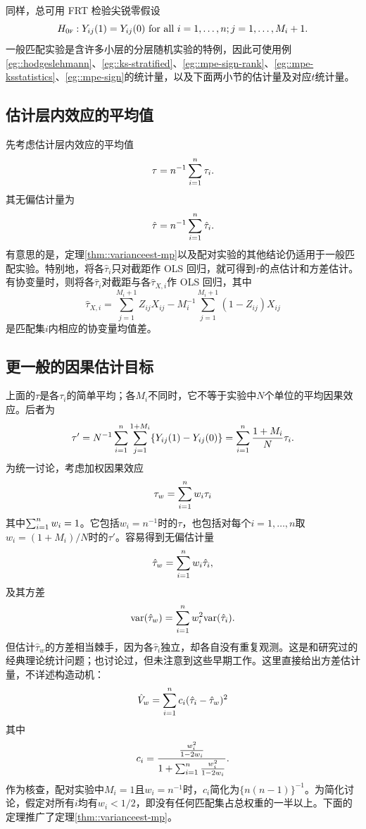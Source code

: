 同样，总可用 FRT 检验尖锐零假设
$$
H_{0\textsc{f}}: Y_{ij}(1) = Y_{ij}(0)  \text{ for all }  i=1,\ldots, n; j=1,\ldots, M_i+1. 
$$
一般匹配实验是含许多小层的分层随机实验的特例，因此可使用例\ref{eg::hodgeslehmann}、\ref{eg::ks-stratified}、\ref{eg::mpe-sign-rank}、\ref{eg::mpe-ksstatistics}、\ref{eg::mpe-sign}的统计量，以及下面两小节的估计量及对应$t$统计量。 



\subsection{估计层内效应的平均值}


先考虑估计层内效应的平均值
$$
\tau = n^{-1} \sum_{i=1}^n \tau_i .
$$
其无偏估计量为
$$
\hat\tau = n^{-1} \sum_{i=1}^n \hat \tau_i . 
$$
有意思的是，定理\ref{thm::varianceest-mp}以及配对实验的其他结论仍适用于一般匹配实验。特别地，将各$\hat \tau_i $只对截距作 OLS 回归，就可得到$\tau$的点估计和方差估计。有协变量时，则将各$\hat \tau_i $对截距与各$\hat\tau_{X,i}$作 OLS 回归，其中
$$
\hat \tau_{X,i} = \sum_{j=1}^{M_i + 1} Z_{ij} X_{ij} - M_i^{-1} \sum_{j=1}^{M_i+1} (1-Z_{ij}) X_{ij}
$$
是匹配集$i$内相应的协变量均值差。 



\subsection{更一般的因果估计目标}


上面的$\tau$是各$\tau_i$的简单平均；各$M_i$不同时，它不等于实验中$N$个单位的平均因果效应。后者为
$$
\tau' = N^{-1} \sum_{i=1}^n \sum_{j=1}^{1+M_i} \{ Y_{ij}(1)-Y_{ij}(0) \} = \sum_{i=1}^n \frac{1+M_i}{N} \tau_i.
$$
为统一讨论，考虑加权因果效应
$$
\tau_w =  \sum_{i=1}^n w_i \tau_i
$$
其中$\sum_{i=1}^n w_i = 1$。它包括$w_i = n^{-1}$时的$\tau$，也包括对每个$i=1,\ldots, n$取$w_i = (1+M_i)/N $时的$\tau'$。容易得到无偏估计量
$$
\hat\tau_w =  \sum_{i=1}^n w_i \hat\tau_i,
$$
及其方差
$$
\textup{var}(\hat\tau_w ) = \sum_{i=1}^n w_i^2 \textup{var} (\hat\tau_i ). 
$$
但估计$\hat\tau_w $的方差相当棘手，因为各$\hat\tau_i$独立，却各自没有重复观测。这是\citet{hartley1969variance}和\citet{rao1970estimation}研究过的经典理论统计问题；\citet{fogarty2018mitigating}也讨论过，但未注意到这些早期工作。这里直接给出方差估计量，不详述构造动机：
$$
\hat{V}_w = \sum_{i=1}^n c_i (\hat\tau_i -\hat\tau_w )  ^2
$$
其中
$$
c_i = \frac{    \frac{w_i^2}{1-2w_i}   }{   1 + \sum_{i=1}^n  \frac{w_i^2}{1-2w_i} }.
$$
作为核查，配对实验中$M_i=1$且$w_i = n^{-1}$时，$c_i $简化为$ \{  n(n-1) \}^{-1}$。为简化讨论，假定对所有$i$均有$w_i < 1/2$，即没有任何匹配集占总权重的一半以上。下面的定理推广了定理\ref{thm::varianceest-mp}。  

